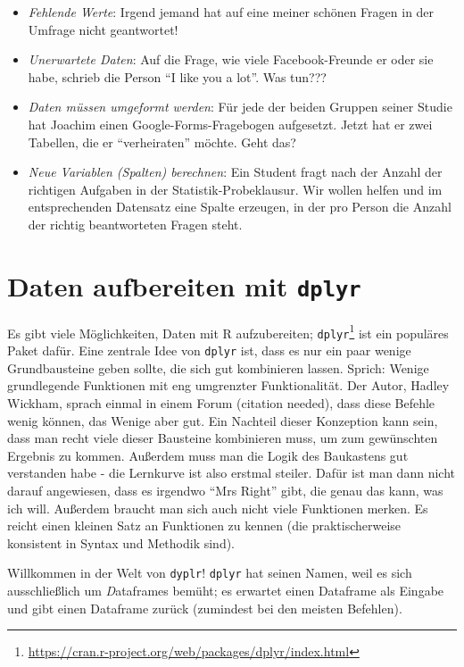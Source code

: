 \documentclass[12pt,ngerman,]{book}
\providecommand{\tightlist}{%
  \setlength{\itemsep}{0pt}\setlength{\parskip}{0pt}}
\let\rmarkdownfootnote\footnote%
\def\footnote{\protect\rmarkdownfootnote}
\begin{document}
\begin{itemize}
\tightlist
\item
  \emph{Fehlende Werte}: Irgend jemand hat auf eine meiner schönen
  Fragen in der Umfrage nicht geantwortet!
\item
  \emph{Unerwartete Daten}: Auf die Frage, wie viele Facebook-Freunde er
  oder sie habe, schrieb die Person ``I like you a lot''. Was tun???
\item
  \emph{Daten müssen umgeformt werden}: Für jede der beiden Gruppen
  seiner Studie hat Joachim einen Google-Forms-Fragebogen aufgesetzt.
  Jetzt hat er zwei Tabellen, die er ``verheiraten'' möchte. Geht das?
\item
  \emph{Neue Variablen (Spalten) berechnen}: Ein Student fragt nach der
  Anzahl der richtigen Aufgaben in der Statistik-Probeklausur. Wir
  wollen helfen und im entsprechenden Datensatz eine Spalte erzeugen, in
  der pro Person die Anzahl der richtig beantworteten Fragen steht.
\end{itemize}

\section{\texorpdfstring{Daten aufbereiten mit
\texttt{dplyr}}{Daten aufbereiten mit dplyr}}\label{daten-aufbereiten-mit-dplyr}

Es gibt viele Möglichkeiten, Daten mit R aufzubereiten;
\texttt{dplyr}\footnote{\url{https://cran.r-project.org/web/packages/dplyr/index.html}}
ist ein populäres Paket dafür. Eine zentrale Idee von \texttt{dplyr}
ist, dass es nur ein paar wenige Grundbausteine geben sollte, die sich
gut kombinieren lassen. Sprich: Wenige grundlegende Funktionen mit eng
umgrenzter Funktionalität. Der Autor, Hadley Wickham, sprach einmal in
einem Forum (citation needed), dass diese Befehle wenig können, das
Wenige aber gut. Ein Nachteil dieser Konzeption kann sein, dass man
recht viele dieser Bausteine kombinieren muss, um zum gewünschten
Ergebnis zu kommen. Außerdem muss man die Logik des Baukastens gut
verstanden habe - die Lernkurve ist also erstmal steiler. Dafür ist man
dann nicht darauf angewiesen, dass es irgendwo ``Mrs Right'' gibt, die
genau das kann, was ich will. Außerdem braucht man sich auch nicht viele
Funktionen merken. Es reicht einen kleinen Satz an Funktionen zu kennen
(die praktischerweise konsistent in Syntax und Methodik sind).

Willkommen in der Welt von \texttt{dyplr}! \texttt{dplyr} hat seinen
Namen, weil es sich ausschließlich um \emph{D}ataframes bemüht; es
erwartet einen Dataframe als Eingabe und gibt einen Dataframe zurück
(zumindest bei den meisten Befehlen).
\end{document}
